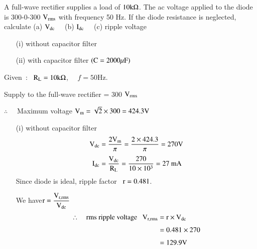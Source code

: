 
\begin{problem}\label{prob1.26}
A full-wave rectifier supplies a load of $10\textrm{k}\Omega$. The ac voltage applied to the diode is 300-0-300 $\textrm{V}_{\text{rms}}$ with frequency 50 Hz. If the diode resistance is neglected, calculate (a) $\textrm{V}_{\text{dc}}$ \ \ (b) $\textrm{I}_{\text{dc}}$ \ \ (c) ripple voltage
\begin{itemize}
\item[(i)] without capacitor filter

\item[(ii)] with capacitor filter $(\textrm{C}=2000\mu\textrm{F})$
\end{itemize}
\end{problem}

\begin{solution}
Given~:~ $\textrm{R}_{\textrm{L}}=10\textrm{k}\Omega$, \ \ $f=50$Hz.

Supply to the full-wave rectifier = 300 $\textrm{V}_{\text{rms}}$

$\therefore$~~ Maximum voltage $\textrm{V}_{\textrm{m}}=\sqrt{2}\times 300=424.3\textrm{V}$
\begin{itemize}
\item[(i)] without capacitor filter
\begin{align*}
\textrm{V}_{\text{dc}} &= \frac{2\textrm{V}_{\textrm{m}}}{\pi}=\dfrac{2\times 424.3}{\pi}=270\textrm{V}\\[3pt]
\textrm{I}_{\text{dc}} &= \frac{\textrm{V}_{\text{dc}}}{\textrm{R}_{\textrm{L}}}=\dfrac{270}{10\times 10^{3}}=27\text{~mA}
\end{align*}
Since diode is ideal, ripple factor \ $\textrm{r}=0.481$.

We have\quad $\textrm{r}=\dfrac{\textrm{V}_{\text{r,rms}}}{\textrm{V}_{\text{dc}}}$
\begin{align*}
\therefore\quad \text{rms ripple voltage~~ }\textrm{V}_{\text{r,rms}} &= \textrm{r}\times \textrm{V}_{\text{dc}}\\[3pt]
&= 0.481\times 270\\[3pt]
&= 129.9\textrm{V}
\end{align*}


\end{itemize}
\end{solution}
